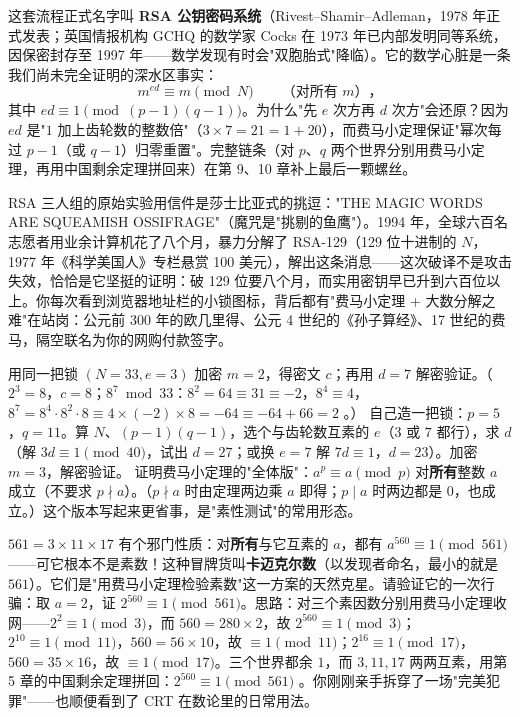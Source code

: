 \begin{faming}
这套流程正式名字叫 \textbf{RSA 公钥密码系统}（Rivest--Shamir--Adleman，1978 年正式发表；英国情报机构 GCHQ 的数学家 Cocks 在 1973 年已内部发明同等系统，因保密封存至 1997 年——数学发现有时会"双胞胎式"降临）。它的数学心脏是一条我们尚未完全证明的深水区事实：
\[
m^{ed} \equiv m \pmod N \qquad \text{（对所有 } m\text{）}，
\]
其中 $ed \equiv 1 \pmod{(p-1)(q-1)}$。为什么"先 $e$ 次方再 $d$ 次方"会还原？因为 $ed$ 是"$1$ 加上齿轮数的整数倍"（$3\times7 = 21 = 1 + 20$），而费马小定理保证"幂次每过 $p-1$（或 $q-1$）归零重置"。完整链条（对 $p$、$q$ 两个世界分别用费马小定理，再用中国剩余定理拼回来）在第 9、10 章补上最后一颗螺丝。
\end{faming}

\begin{lishi}
RSA 三人组的原始实验用信件是莎士比亚式的挑逗："THE MAGIC WORDS ARE SQUEAMISH OSSIFRAGE"（魔咒是"挑剔的鱼鹰"）。1994 年，全球六百名志愿者用业余计算机花了八个月，暴力分解了 RSA-129（129 位十进制的 $N$，1977 年《科学美国人》专栏悬赏 100 美元），解出这条消息——这次破译不是攻击失效，恰恰是它坚挺的证明：破 129 位要八个月，而实用密钥早已升到六百位以上。你每次看到浏览器地址栏的小锁图标，背后都有"费马小定理 + 大数分解之难"在站岗：公元前 300 年的欧几里得、公元 4 世纪的《孙子算经》、17 世纪的费马，隔空联名为你的网购付款签字。
\end{lishi}

\begin{dongshou}
\begin{itemize}
  \yisi 用同一把锁 $(N=33, e=3)$ 加密 $m = 2$，得密文 $c$；再用 $d = 7$ 解密验证。（$2^3 = 8$，$c = 8$；$8^7 \bmod 33$：$8^2 = 64 \equiv 31 \equiv -2$，$8^4 \equiv 4$，$8^7 = 8^4\cdot8^2\cdot8 \equiv 4\times(-2)\times8 = -64 \equiv -64 + 66 = 2$ \checkmark。）
  \yier 自己造一把锁：$p = 5$，$q = 11$。算 $N$、$(p-1)(q-1)$，选个与齿轮数互素的 $e$（$3$ 或 $7$ 都行），求 $d$（解 $3d\equiv1 \pmod{40}$，试出 $d = 27$；或换 $e=7$ 解 $7d\equiv1$，$d=23$）。加密 $m = 3$，解密验证。
  \yier 证明费马小定理的"全体版"：$a^p \equiv a \pmod p$ 对\textbf{所有}整数 $a$ 成立（不要求 $p \nmid a$）。（$p\nmid a$ 时由定理两边乘 $a$ 即得；$p \mid a$ 时两边都是 $0$，也成立。）这个版本写起来更省事，是"素性测试"的常用形态。
\end{itemize}
\end{dongshou}

\begin{shaonao}
$561 = 3\times11\times17$ 有个邪门性质：对\textbf{所有}与它互素的 $a$，都有 $a^{560} \equiv 1 \pmod{561}$——可它根本不是素数！这种冒牌货叫\textbf{卡迈克尔数}（以发现者命名，最小的就是 $561$）。它们是"用费马小定理检验素数"这一方案的天然克星。请验证它的一次行骗：取 $a = 2$，证 $2^{560} \equiv 1 \pmod{561}$。思路：对三个素因数分别用费马小定理收网——$2^{2} \equiv 1 \pmod 3$，而 $560 = 280\times2$，故 $2^{560}\equiv1\pmod3$；$2^{10}\equiv1\pmod{11}$，$560 = 56\times10$，故 $\equiv 1 \pmod{11}$；$2^{16}\equiv1\pmod{17}$，$560 = 35\times16$，故 $\equiv 1 \pmod{17}$。三个世界都余 $1$，而 $3, 11, 17$ 两两互素，用第 5 章的中国剩余定理拼回：$2^{560}\equiv1\pmod{561}$ \checkmark。你刚刚亲手拆穿了一场"完美犯罪"——也顺便看到了 CRT 在数论里的日常用法。
\end{shaonao}


